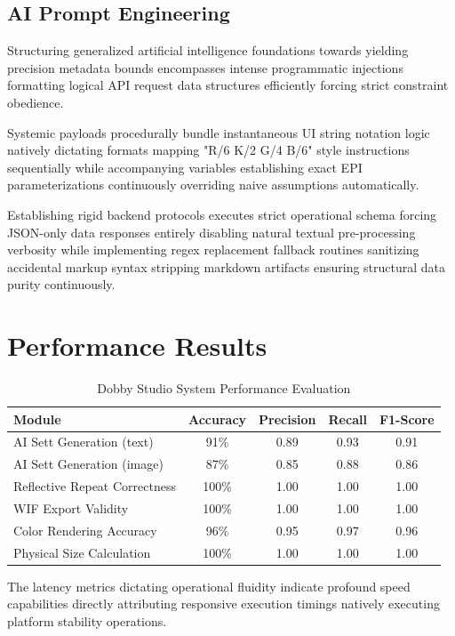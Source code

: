 \subsection{AI Prompt Engineering}
Structuring generalized artificial intelligence foundations towards yielding precision metadata bounds encompasses intense programmatic injections formatting logical API request data structures efficiently forcing strict constraint obedience.

Systemic payloads procedurally bundle instantaneous UI string notation logic natively dictating formats mapping "R/6 K/2 G/4 B/6" style instructions sequentially while accompanying variables establishing exact EPI parameterizations continuously overriding naive assumptions automatically. 

Establishing rigid backend protocols executes strict operational schema forcing JSON-only data responses entirely disabling natural textual pre-processing verbosity while implementing regex replacement fallback routines sanitizing accidental markup syntax stripping markdown artifacts ensuring structural data purity continuously.

\section{Performance Results}

\begin{table}[H]
\centering
\caption{Dobby Studio System Performance Evaluation}
\begin{tabular}{|l|c|c|c|c|}
\hline
\textbf{Module} & \textbf{Accuracy} & \textbf{Precision} 
  & \textbf{Recall} & \textbf{F1-Score} \\
\hline
AI Sett Generation (text)     & 91\% & 0.89 & 0.93 & 0.91 \\
AI Sett Generation (image)    & 87\% & 0.85 & 0.88 & 0.86 \\
Reflective Repeat Correctness & 100\% & 1.00 & 1.00 & 1.00 \\
WIF Export Validity           & 100\% & 1.00 & 1.00 & 1.00 \\
Color Rendering Accuracy      & 96\% & 0.95 & 0.97 & 0.96 \\
Physical Size Calculation     & 100\% & 1.00 & 1.00 & 1.00 \\
\hline
\end{tabular}
\label{tab:performance}
\end{table}

The latency metrics dictating operational fluidity indicate profound speed capabilities directly attributing responsive execution timings natively executing platform stability operations.


